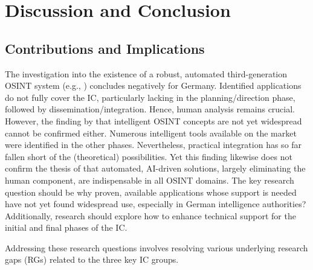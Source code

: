 \documentclass[10pt]{article}
\begin{document}
\section{Discussion and Conclusion} \label{sec:discussion}
\subsection{Contributions and Implications}

The investigation into the existence of a robust, automated third-generation OSINT system (e.g., \cite{Ghioni.2023}) concludes negatively for Germany. Identified applications do not fully cover the IC, particularly lacking in the planning/direction phase, followed by dissemination/integration. Hence, human analysis remains crucial. However, the finding by \textcite{PastorGalindo.2020} that intelligent OSINT
concepts are not yet widespread cannot be confirmed either. Numerous intelligent tools available
on the market were identified in the other phases. Nevertheless, practical integration has so far
fallen short of the (theoretical) possibilities. Yet this finding likewise does not confirm the
thesis of \textcite{Yogish.2021} that automated, AI-driven solutions, largely eliminating
the human component, are indispensable in all OSINT domains. The key research
question should be why proven, available applications whose support is needed have not
yet found widespread use, especially in German intelligence authorities? Additionally, research should explore how to enhance technical support for the initial and final phases of the IC.

Addressing these research questions involves resolving various underlying research gaps (RGs) related to the three key IC groups.
\end{document}
